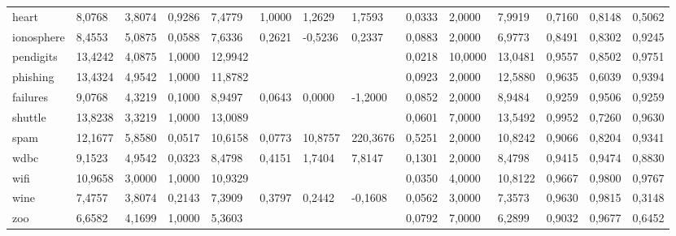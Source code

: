 \documentclass[runningheads]{llncs}
\begin{document}
\begin{table}[ht]
\begin{adjustbox}{width=1\textwidth}
\begin{tabular}{|l|l|l|l|l|l|l|l|l|l|l|l|l|l|}
heart      & 8,0768   & 3,8074     & 0,9286          & 7,4779        & 1,0000            & 1,2629     & 1,7593         & 0,0333   & 2,0000  & 7,9919  & 0,7160         & 0,8148          & 0,5062           \\
ionosphere & 8,4553   & 5,0875     & 0,0588          & 7,6336        & 0,2621            & -0,5236    & 0,2337         & 0,0883   & 2,0000  & 6,9773  & 0,8491         & 0,8302          & 0,9245           \\
pendigits  & 13,4242  & 4,0875     & 1,0000          & 12,9942       &                   &            &                & 0,0218   & 10,0000 & 13,0481 & 0,9557         & 0,8502          & 0,9751           \\
phishing   & 13,4324  & 4,9542     & 1,0000          & 11,8782       &                   &            &                & 0,0923   & 2,0000  & 12,5880 & 0,9635         & 0,6039          & 0,9394           \\
failures   & 9,0768   & 4,3219     & 0,1000          & 8,9497        & 0,0643            & 0,0000     & -1,2000        & 0,0852   & 2,0000  & 8,9484  & 0,9259         & 0,9506          & 0,9259           \\
shuttle    & 13,8238  & 3,3219     & 1,0000          & 13,0089       &                   &            &                & 0,0601   & 7,0000  & 13,5492 & 0,9952         & 0,7260          & 0,9630           \\
spam       & 12,1677  & 5,8580     & 0,0517          & 10,6158       & 0,0773            & 10,8757    & 220,3676       & 0,5251   & 2,0000  & 10,8242 & 0,9066         & 0,8204          & 0,9341           \\
wdbc       & 9,1523   & 4,9542     & 0,0323          & 8,4798        & 0,4151            & 1,7404     & 7,8147         & 0,1301   & 2,0000  & 8,4798  & 0,9415         & 0,9474          & 0,8830           \\
wifi       & 10,9658  & 3,0000     & 1,0000          & 10,9329       &                   &            &                & 0,0350   & 4,0000  & 10,8122 & 0,9667         & 0,9800          & 0,9767           \\
wine       & 7,4757   & 3,8074     & 0,2143          & 7,3909        & 0,3797            & 0,2442     & -0,1608        & 0,0562   & 3,0000  & 7,3573  & 0,9630         & 0,9815          & 0,3148           \\
zoo        & 6,6582   & 4,1699     & 1,0000          & 5,3603        &                   &            &                & 0,0792   & 7,0000  & 6,2899  & 0,9032         & 0,9677          & 0,6452           \\

\end{tabular}
\end{adjustbox}
\end{table}
\end{document}
